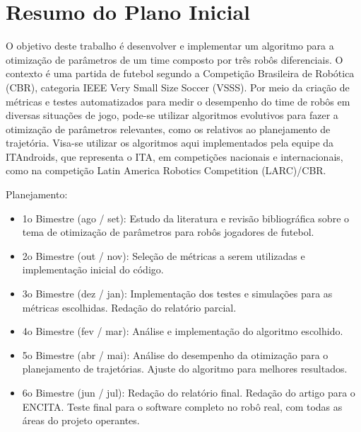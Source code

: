 \documentclass[a4paper,12pt]{article}
\begin{document}




\tableofcontents

\newpage

\section{Resumo do Plano Inicial}
\label{secao:plano_inicial}

O objetivo deste trabalho é desenvolver e implementar um algoritmo para a otimização de parâmetros de um time composto por três robôs diferenciais. O contexto é uma partida de futebol segundo a Competição Brasileira de Robótica (CBR), categoria IEEE Very Small Size Soccer (VSSS). Por meio da criação de métricas e testes automatizados para medir o desempenho do time de robôs em diversas situações de jogo, pode-se utilizar algoritmos evolutivos para fazer a otimização de parâmetros relevantes, como os relativos ao planejamento de trajetória. Visa-se utilizar os algoritmos aqui implementados pela equipe da ITAndroids, que representa o ITA, em competições nacionais e internacionais, como na competição Latin America Robotics Competition (LARC)/CBR.

Planejamento:
\begin{itemize}

\item 1o Bimestre (ago / set): Estudo da literatura e revisão bibliográfica sobre o tema de otimização de parâmetros para robôs jogadores de futebol.

\item 2o Bimestre (out / nov): Seleção de métricas a serem utilizadas e implementação inicial do código.

\item 3o Bimestre (dez / jan): Implementação dos testes e simulações para as métricas escolhidas. Redação do relatório parcial.

\item 4o Bimestre (fev / mar): Análise e implementação do algoritmo escolhido.

\item 5o Bimestre (abr / mai): Análise do desempenho da otimização para o planejamento de trajetórias. Ajuste do algoritmo para melhores resultados.

\item 6o Bimestre (jun / jul): Redação do relatório final. Redação do artigo para o ENCITA. Teste final para o software completo no robô real, com todas as áreas do projeto operantes.

\end{itemize}
\end{document}
